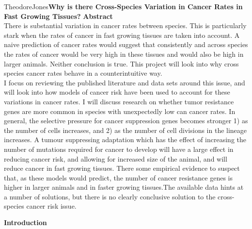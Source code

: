 \documentclass[12pt,letterpaper]{article}
\begin{document}
\begin{mla}{Theodore}{Jones}{}{}{}{\textbf{Why is there Cross-Species Variation in Cancer Rates in Fast Growing Tissues?}}
\noindent \textbf{Abstract} \\
There is substantial variation in cancer rates between species. This is particularly stark when the rates of cancer in fast growing tissues are taken into account. A naive prediction of cancer rates would suggest that consistently and across species the rates of cancer would be very high in these tissues and would also be high in larger animals. Neither conclusion is true. This project will look into why cross species cancer rates behave in a counterintuitive way. \\
I focus on reviewing the published literature and data sets around this issue, and will look into how models of cancer risk have been used to account for these variations in cancer rates. I will discuss research on whether tumor resistance genes are more common in species with unexpectedly low can cancer rates. In general, the selective pressure for cancer suppression genes becomes stronger 1) as the number of cells increases, and 2) as the number of cell divisions in the lineage increases. A tumour suppressing adaptation which has the effect of increasing the number of mutations required for cancer to develop will have a large effect in reducing cancer risk, and allowing for increased size of the animal, and will reduce cancer in fast growing tissues.  There some empirical evidence to suspect that, as these models would predict, the number of cancer resistance genes is higher in larger animals and in faster growing tissues.The available data hints at a number of solutions, but there is no clearly conclusive solution to the cross-species cancer risk issue.  \newpage

\noindent \textbf{Introduction} \\


\end{mla}
\end{document}
